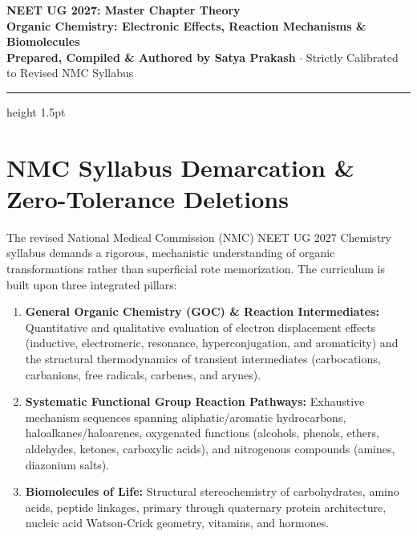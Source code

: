 \documentclass[10pt,a4paper]{article}
\begin{document}
\begin{center}
  {\Huge \textbf{NEET UG 2027: Master Chapter Theory}}\\[6pt]
  {\Large \textbf{Organic Chemistry: Electronic Effects, Reaction Mechanisms \& Biomolecules}}\\[4pt]
  {\small \textbf{Prepared, Compiled \& Authored by Satya Prakash} $\cdot$ Strictly Calibrated to Revised NMC Syllabus}
  \vspace{4pt}
  \hrule height 1.5pt
\end{center}

\section{NMC Syllabus Demarcation \& Zero-Tolerance Deletions}

\begin{conceptbox}
The revised National Medical Commission (NMC) NEET UG 2027 Chemistry syllabus demands a rigorous, mechanistic understanding of organic transformations rather than superficial rote memorization. The curriculum is built upon three integrated pillars:
\begin{enumerate}[leftmargin=*]
  \item \textbf{General Organic Chemistry (GOC) \& Reaction Intermediates:} Quantitative and qualitative evaluation of electron displacement effects (inductive, electromeric, resonance, hyperconjugation, and aromaticity) and the structural thermodynamics of transient intermediates (carbocations, carbanions, free radicals, carbenes, and arynes).
  \item \textbf{Systematic Functional Group Reaction Pathways:} Exhaustive mechanism sequences spanning aliphatic/aromatic hydrocarbons, haloalkanes/haloarenes, oxygenated functions (alcohols, phenols, ethers, aldehydes, ketones, carboxylic acids), and nitrogenous compounds (amines, diazonium salts).
  \item \textbf{Biomolecules of Life:} Structural stereochemistry of carbohydrates, amino acids, peptide linkages, primary through quaternary protein architecture, nucleic acid Watson-Crick geometry, vitamins, and hormones.
\end{enumerate}
\end{conceptbox}
\end{document}
